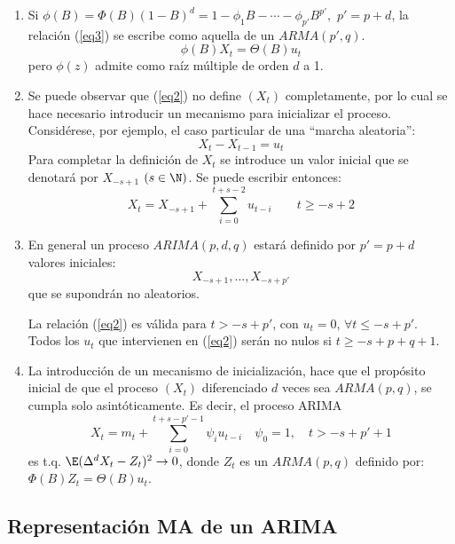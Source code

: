\begin{observacion}
\quad
\begin{enumerate}
\item Si $\phi (B)=\Phi \left( B \right)(1-B)^{d}=1-\phi_{1} B-\cdots-\phi_{p'} B^{p'},$ $p'=p+d$, la relaci\'{o}n (\ref{eq3}) se escribe como aquella de un $ARMA(p',q)$.
\[
\phi (B)X_{t} =\Theta (B)u_{t} 
\]
pero $\phi (z)$ admite como ra\'{i}z m\'{u}ltiple de orden $d$ a 1.

\item Se puede observar que (\ref{eq2}) no define $(X_{t})$ completamente, por lo cual se hace necesario introducir un mecanismo para inicializar el proceso. Consid\'{e}rese, por ejemplo, el caso particular de una ``marcha aleatoria'':
\[
X_{t} -X_{t-1} =u_{t} 
\]
Para completar la definici\'{o}n de $X_{t}$ se introduce un valor inicial que se denotar\'{a} por $X_{-s+1}$ $(s\in \N)$. Se puede escribir entonces:
\[
X_{t} =X_{-s+1} +\sum_{i=0}^{t+s-2} {u_{t-i} } 
\qquad
t\ge -s+2
\]

\item En general un proceso $ARIMA(p,d,q)$ estar\'{a} definido por $p'=p+d$ valores iniciales:
\[
X_{-s+1} ,\ldots,X_{-s+p'} 
\]
que se supondr\'{a}n no aleatorios.\newline

La relaci\'{o}n (\ref{eq2}) es v\'{a}lida para $t>-s+p'$, con $u_{t}=0$, $\forall t\le -s+p'$. Todos los $u_{t}$ que intervienen en (\ref{eq2}) ser\'{a}n no nulos si $t\ge - s+p+q+1$.

\item La introducci\'{o}n de un mecanismo de inicializaci\'{o}n, hace que el prop\'{o}sito inicial de que el proceso $(X_{t})$ diferenciado $d$ veces sea $ARMA (p,q)$, se cumpla solo asint\'{o}ticamente. Es decir, el proceso ARIMA
\[
X_{t} =m_{t} +\sum_{i=0}^{t+s-p'-1} {\psi_{i} u_{t-i} } \quad \psi_{0} =1,\quad t>-s+p'+1
\]
es t.q. $\E(\Delta^{d}X_{t} -Z_{t} )^{2}\to 0$, donde $Z_{t} $ es un $ARMA (p,q)$ definido por: $\Phi (B)Z_{t} =\Theta (B)u_{t} $.
\end{enumerate}
\end{observacion}

\subsection{Representaci\'{o}n MA de un ARIMA}

